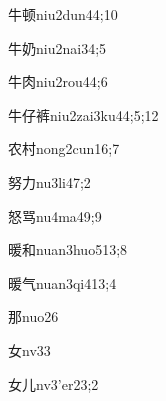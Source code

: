 \begin{verbete}{牛顿}{niu2dun4}{4;10}
\end{verbete}

\begin{verbete}{牛奶}{niu2nai3}{4;5}
\end{verbete}

\begin{verbete}{牛肉}{niu2rou4}{4;6}
\end{verbete}

\begin{verbete}{牛仔裤}{niu2zai3ku4}{4;5;12}
\end{verbete}

\begin{verbete}{农村}{nong2cun1}{6;7}
\end{verbete}

\begin{verbete}{努力}{nu3li4}{7;2}
\end{verbete}

\begin{verbete}{怒骂}{nu4ma4}{9;9}
\end{verbete}

\begin{verbete}{暖和}{nuan3huo5}{13;8}
\end{verbete}

\begin{verbete}{暖气}{nuan3qi4}{13;4}
\end{verbete}

\begin{verbete}{那}{nuo2}{6}
\end{verbete}

\begin{verbete}{女}{nv3}{3}
\end{verbete}

\begin{verbete}{女儿}{nv3'er2}{3;2}
\end{verbete}

